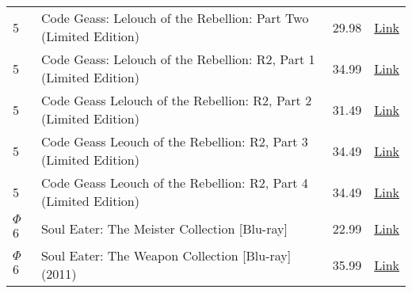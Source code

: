 \documentclass[12pt]{article}
\begin{document}
\begin{longtable}{ | p{1.3cm} | p{12cm} | l | l |}
5 & Code Geass: Lelouch of the Rebellion: Part Two (Limited Edition) & 29.98 & \href{http://www.amazon.com/Code-Geass-Lelouch-Rebellion-Limited/dp/B001HCQW16/ref=wl_it_dp_o_pd_T1?ie=UTF8&coliid=I2PUPSZCK2P1LO&colid=2CEAJ0SZHT29K}{Link} \\
5 & Code Geass: Lelouch of the Rebellion: R2, Part 1 (Limited Edition) & 34.99 & \href{http://www.amazon.com/Code-Geass-Lelouch-Rebellion-Limited/dp/B0028X6L1E/ref=sr_1_6?s=movies-tv&ie=UTF8&qid=1322588215&sr=1-6}{Link} \\
5 & Code Geass Lelouch of the Rebellion: R2, Part 2 (Limited Edition) & 31.49 & \href{http://www.amazon.com/Code-Geass-Lelouch-Rebellion-Limited/dp/B002KLALBA/ref=sr_1_7?s=movies-tv&ie=UTF8&qid=1322588215&sr=1-7}{Link} \\
5 & Code Geass Leouch of the Rebellion: R2, Part 3 (Limited Edition) & 34.49 & \href{http://www.amazon.com/Code-Geass-Leouch-Rebellion-Limited/dp/B002OVB9NK/ref=sr_1_9?s=movies-tv&ie=UTF8&qid=1322588215&sr=1-9}{Link} \\
5 & Code Geass Leouch of the Rebellion: R2, Part 4 (Limited Edition) & 34.49 & \href{http://www.amazon.com/Code-Geass-Leouch-Rebellion-Limited/dp/B0030YGDPO/ref=sr_1_8?s=movies-tv&ie=UTF8&qid=1322588215&sr=1-8}{Link} \\
$\Phi$ 6 & Soul Eater: The Meister Collection [Blu-ray] & 22.99 & \href{http://www.amazon.com/Soul-Eater-Meister-Collection-Blu-ray/dp/B004GZZGWM/ref=cm_cr_pr_product_top}{Link} \\
$\Phi$ 6 & Soul Eater: The Weapon Collection [Blu-ray] (2011) & 35.99 & \href{http://www.amazon.com/Soul-Eater-Weapon-Collection-Blu-ray/dp/B004WCSMEI/ref=pd_bxgy_mov_text_b}{Link} \\
\hline
\end{longtable}
\end{document}
